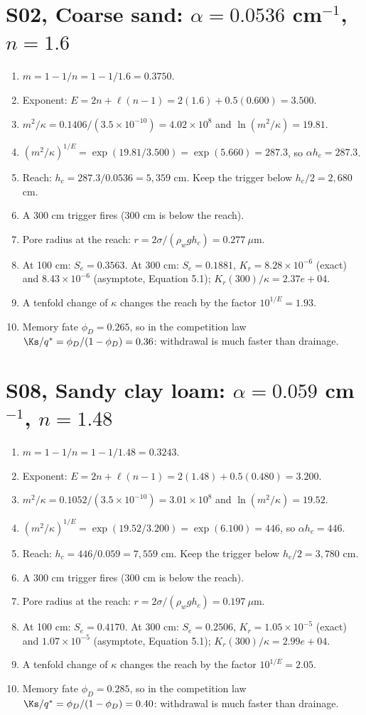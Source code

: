 \section{S02, Coarse sand: $\alpha=0.0536$ cm$^{-1}$, $n=1.6$}
\begin{enumerate}[leftmargin=*,itemsep=1pt]
\item $m=1-1/n=1-1/1.6=0.3750$.
\item Exponent: $E=2n+\ell(n-1)=2(1.6)+0.5(0.600)=3.500$.
\item $m^2/\kappa=0.1406/(3.5\times10^{-10})=4.02\times10^{8}$ and $\ln(m^2/\kappa)=19.81$.
\item $(m^2/\kappa)^{1/E}=\exp(19.81/3.500)=\exp(5.660)=287.3$, so $\alpha h_c=287.3$.
\item Reach: $h_c=287.3/0.0536=5,359$ cm. Keep the trigger below $h_c/2=2,680$ cm.
\item A 300 cm trigger fires (300 cm is below the reach).
\item Pore radius at the reach: $r=2\sigma/(\rho_wgh_c)=0.277\ \mu$m.
\item At 100 cm: $S_e=0.3563$. At 300 cm: $S_e=0.1881$, $K_r=8.28\times10^{-6}$ (exact) and $8.43\times10^{-6}$ (asymptote, Equation 5.1); $K_r(300)/\kappa=2.37e+04$.
\item A tenfold change of $\kappa$ changes the reach by the factor $10^{1/E}=1.93$.
\item Memory fate $\phi_D=0.265$, so in the competition law $\Ks/q^*=\phi_D/(1-\phi_D)=0.36$: withdrawal is much faster than drainage.
\end{enumerate}
\section{S08, Sandy clay loam: $\alpha=0.059$ cm$^{-1}$, $n=1.48$}
\begin{enumerate}[leftmargin=*,itemsep=1pt]
\item $m=1-1/n=1-1/1.48=0.3243$.
\item Exponent: $E=2n+\ell(n-1)=2(1.48)+0.5(0.480)=3.200$.
\item $m^2/\kappa=0.1052/(3.5\times10^{-10})=3.01\times10^{8}$ and $\ln(m^2/\kappa)=19.52$.
\item $(m^2/\kappa)^{1/E}=\exp(19.52/3.200)=\exp(6.100)=446$, so $\alpha h_c=446$.
\item Reach: $h_c=446/0.059=7,559$ cm. Keep the trigger below $h_c/2=3,780$ cm.
\item A 300 cm trigger fires (300 cm is below the reach).
\item Pore radius at the reach: $r=2\sigma/(\rho_wgh_c)=0.197\ \mu$m.
\item At 100 cm: $S_e=0.4170$. At 300 cm: $S_e=0.2506$, $K_r=1.05\times10^{-5}$ (exact) and $1.07\times10^{-5}$ (asymptote, Equation 5.1); $K_r(300)/\kappa=2.99e+04$.
\item A tenfold change of $\kappa$ changes the reach by the factor $10^{1/E}=2.05$.
\item Memory fate $\phi_D=0.285$, so in the competition law $\Ks/q^*=\phi_D/(1-\phi_D)=0.40$: withdrawal is much faster than drainage.
\end{enumerate}
